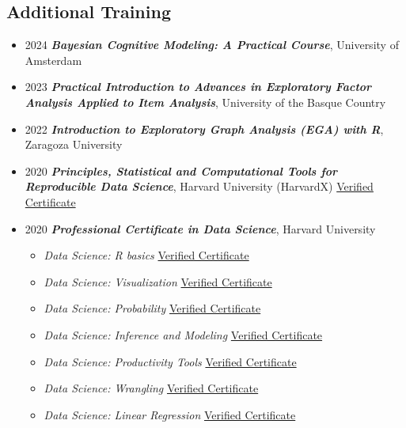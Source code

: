 \documentclass[
  letterpaper,
  DIV=11,
  numbers=noendperiod]{scrartcl}
\providecommand{\tightlist}{%
  \setlength{\itemsep}{0pt}\setlength{\parskip}{0pt}}
\begin{document}
\subsection{\texorpdfstring{ Additional
Training}{ Additional Training}}\label{additional-training}

\begin{itemize}
\tightlist
\item
  2024 \textbar{} \textbf{\emph{Bayesian Cognitive Modeling: A Practical
  Course}}, University of Amsterdam
\item
  2023 \textbar{} \textbf{\emph{Practical Introduction to Advances in
  Exploratory Factor Analysis Applied to Item Analysis}}, University of
  the Basque Country
\item
  2022 \textbar{} \textbf{\emph{Introduction to Exploratory Graph
  Analysis (EGA) with R}}, Zaragoza University
\item
  2020 \textbar{} \textbf{\emph{Principles, Statistical and
  Computational Tools for Reproducible Data Science}}, Harvard
  University (HarvardX) \textbar{}
  \href{https://courses.edx.org/certificates/d9d5e1f33f6f4c4cb9a43da41912cfa6}{Verified
  Certificate}
\item
  2020 \textbar{} \textbf{\emph{Professional Certificate in Data
  Science}}, Harvard University

  \begin{itemize}
  \tightlist
  \item
    \emph{Data Science: R basics} \textbar{}
    \href{https://courses.edx.org/certificates/2d9521b4289a45adb89344b808b6f60b}{Verified
    Certificate}\\
  \item
    \emph{Data Science: Visualization} \textbar{}
    \href{https://courses.edx.org/certificates/025e5081c72a40c79428ca56145281d5}{Verified
    Certificate}\\
  \item
    \emph{Data Science: Probability} \textbar{}
    \href{https://courses.edx.org/certificates/a4747f3de2164ab48da36dc6dbeab1d4}{Verified
    Certificate}\\
  \item
    \emph{Data Science: Inference and Modeling} \textbar{}
    \href{https://courses.edx.org/certificates/09f023dfd1bf4b8b896db4a905670733}{Verified
    Certificate}\\
  \item
    \emph{Data Science: Productivity Tools} \textbar{}
    \href{https://courses.edx.org/certificates/b26c03638c3c46e4a97fcb822f70210c}{Verified
    Certificate}\\
  \item
    \emph{Data Science: Wrangling} \textbar{}
    \href{https://courses.edx.org/certificates/51759921d48a416186b5517318d72135}{Verified
    Certificate}\\
  \item
    \emph{Data Science: Linear Regression} \textbar{}
    \href{https://courses.edx.org/certificates/470c6bb6fe2b4fe8913208d5edda44a3}{Verified
    Certificate}
  \end{itemize}
\end{itemize}
\end{document}
